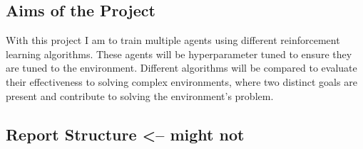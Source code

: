 \subsection{Aims of the Project}

With this project I am to train multiple agents using different reinforcement learning algorithms. These agents will be hyperparameter tuned to ensure they are tuned to the environment. Different algorithms will be compared to evaluate their effectiveness to solving complex environments, where two distinct goals are present and contribute to solving the environment's problem.



\subsection{Report Structure <-- might not}
